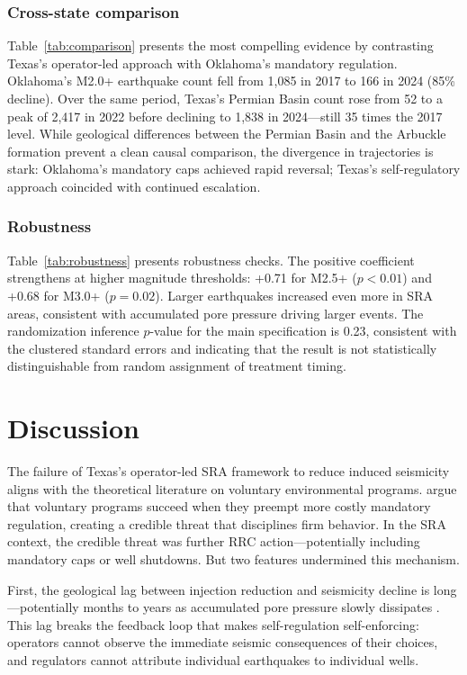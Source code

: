 \documentclass[12pt]{article}
\begin{document}
\subsubsection*{Cross-state comparison} Table~\ref{tab:comparison} presents the most compelling evidence by contrasting Texas's operator-led approach with Oklahoma's mandatory regulation. Oklahoma's M2.0+ earthquake count fell from 1,085 in 2017 to 166 in 2024 (85\% decline). Over the same period, Texas's Permian Basin count rose from 52 to a peak of 2,417 in 2022 before declining to 1,838 in 2024---still 35 times the 2017 level. While geological differences between the Permian Basin and the Arbuckle formation prevent a clean causal comparison, the divergence in trajectories is stark: Oklahoma's mandatory caps achieved rapid reversal; Texas's self-regulatory approach coincided with continued escalation.



\subsubsection*{Robustness} Table~\ref{tab:robustness} presents robustness checks. The positive coefficient strengthens at higher magnitude thresholds: +0.71 for M2.5+ ($p < 0.01$) and +0.68 for M3.0+ ($p = 0.02$). Larger earthquakes increased even more in SRA areas, consistent with accumulated pore pressure driving larger events. The randomization inference $p$-value for the main specification is 0.23, consistent with the clustered standard errors and indicating that the result is not statistically distinguishable from random assignment of treatment timing.



\section{Discussion}

The failure of Texas's operator-led SRA framework to reduce induced seismicity aligns with the theoretical literature on voluntary environmental programs. \citet{lyon2004corporate} argue that voluntary programs succeed when they preempt more costly mandatory regulation, creating a credible threat that disciplines firm behavior. In the SRA context, the credible threat was further RRC action---potentially including mandatory caps or well shutdowns. But two features undermined this mechanism.

First, the geological lag between injection reduction and seismicity decline is long---potentially months to years as accumulated pore pressure slowly dissipates \citep{keranen2018induced}. This lag breaks the feedback loop that makes self-regulation self-enforcing: operators cannot observe the immediate seismic consequences of their choices, and regulators cannot attribute individual earthquakes to individual wells.
\end{document}
